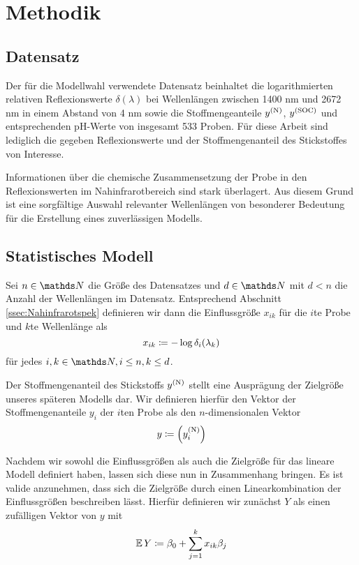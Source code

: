 \section{Methodik}
\label{sec:Methodik}

	\subsection{Datensatz}
	\label{ssec:Datensatz}

	    Der für die Modellwahl verwendete Datensatz beinhaltet die logarithmierten relativen Reflexionswerte $\delta(\lambda)$ bei Wellenlängen zwischen 1400 nm und 2672 nm in einem Abstand von 4 nm sowie die Stoffmengeanteile $y^{\mathrm{(N)}}$, $y^{\mathrm{(SOC)}}$ und entsprechenden pH-Werte von insgesamt 533 Proben.
	    Für diese Arbeit sind lediglich die gegeben Reflexionswerte und der Stoffmengenanteil des Stickstoffes von Interesse.

	    Informationen über die chemische Zusammensetzung der Probe in den Reflexionswerten im Nahinfrarotbereich sind stark überlagert.\cite{Agelet2010}
	    Aus diesem Grund ist eine sorgfältige Auswahl relevanter Wellenlängen von besonderer Bedeutung für die Erstellung eines zuverlässigen Modells.



	\subsection{Statistisches Modell}
	\label{ssec:Statistisches Modell}

	    Sei $n\in\SN$ die Größe des Datensatzes und $d\in\SN$ mit $d< n$ die Anzahl der Wellenlängen im Datensatz.
	    Entsprechend Abschnitt \ref{ssec:Nahinfrarotspek} definieren wir dann die Einflussgröße $x_{ik}$ für die $i$te Probe und $k$te Wellenlänge als
	    \[
			x_{ik} \coloneqq -\log \delta_i(\lambda_k)
		\]
		für jedes $i,k\in\SN,i\leq n,k\leq d$.

	    Der Stoffmengenanteil des Stickstoffs  $y^{\mathrm{(N)}}$ stellt eine Ausprägung der Zielgröße unseres späteren Modells dar.
	    Wir definieren hierfür den Vektor der Stoffmengenanteile $y_i$ der $i$ten Probe als den $n$-dimensionalen Vektor
		\[
			 y \coloneqq \left( y^{\mathrm{(N)}}_i \right)
		\]

        Nachdem wir sowohl die Einflussgrößen als auch die Zielgröße für das lineare Modell definiert haben, lassen sich diese nun in Zusammenhang bringen.
        Es ist valide anzunehmen, dass sich die Zielgröße durch einen Linearkombination der Einflussgrößen beschreiben lässt.
        Hierfür definieren wir zunächst $Y$ als einen zufälligen Vektor von $y$ mit
        \[
			 \operatorname{\mathbb{E}} Y \coloneqq \beta_0 + \sum_{j=1}^k{x_{ik}\beta_j}
		\]


